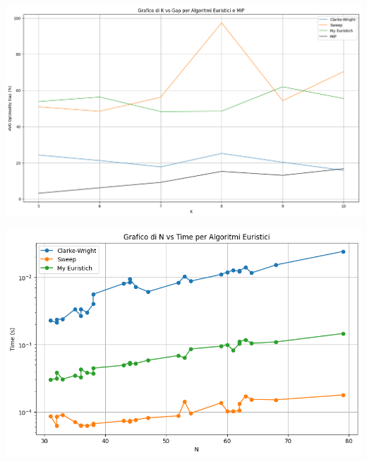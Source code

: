 \documentclass[compress]{beamer}
\begin{document}
\begin{frame}{\subsecname}
    \begin{center}
		\begin{minipage}{1\textwidth}
            \centering
            \includegraphics[width=1\linewidth]{images/K_gap.png}
        \end{minipage}
    \end{center}
\end{frame}

\begin{frame}{\subsecname}
    \begin{center}
		\begin{minipage}{1\textwidth}
            \centering
            \includegraphics[width=1\linewidth]{images/N_time.png}
        \end{minipage}
    \end{center}
\end{frame}

\end{document}
